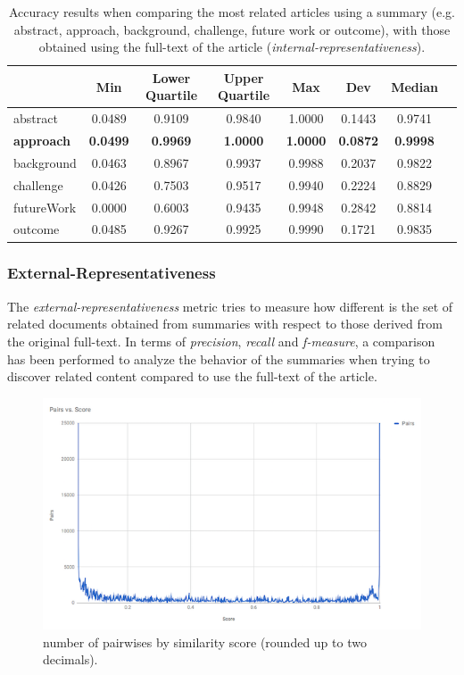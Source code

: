 \begin{table}[!htb]
    \centering
        \begin{tabular}{l*{6}{c}r}\hline
                        & Min & Lower Quartile & Upper Quartile & Max & Dev  & Median \\
          \hline
          abstract & 0.0489 & 0.9109 & 0.9840 & 1.0000 & 0.1443 & 0.9741 \\
          \textbf{approach} & \textbf{0.0499} & \textbf{0.9969} & \textbf{1.0000} & \textbf{1.0000} & \textbf{0.0872} & \textbf{0.9998} \\
          background & 0.0463 & 0.8967 & 0.9937 & 0.9988 & 0.2037 & 0.9822 \\
          challenge & 0.0426 & 0.7503 & 0.9517 & 0.9940 & 0.2224 & 0.8829 \\
          futureWork & 0.0000 & 0.6003 & 0.9435 & 0.9948 & 0.2842 & 0.8814 \\
          outcome & 0.0485 & 0.9267 & 0.9925 & 0.9990 & 0.1721 & 0.9835 \\
        \end{tabular}
    \caption{ Accuracy results when comparing the most related articles using a summary (e.g. abstract, approach, background, challenge, future work or outcome), with those obtained using the full-text of the article (\textit{internal-representativeness}).}\label{tab:irepresentativeness}
\end{table}

\subsubsection{External-Representativeness}  

The \textit{external-representativeness} metric tries to measure how different is the set of related documents obtained from summaries with respect to those derived from the original full-text. In terms of \textit{precision}, \textit{recall} and \textit{f-measure}, a comparison has been performed to analyze the behavior of the summaries when trying to discover related content compared to use the full-text of the article.

\begin{figure}[!htbp]
  \center
  \includegraphics[scale=0.45]{similarities.png}
  \caption{number of pairwises by similarity score (rounded up to two decimals).}
  \label{fig:similarities}
\end{figure}


